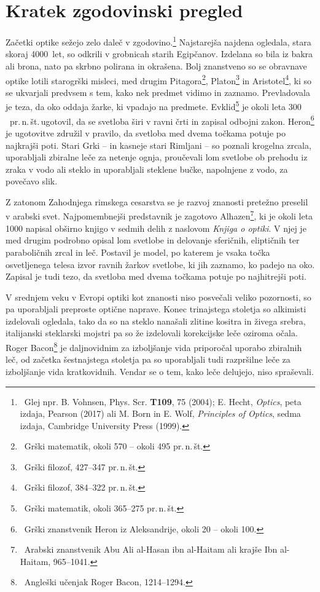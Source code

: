 \section{Kratek zgodovinski pregled}
Začetki optike sežejo zelo daleč v zgodovino.\footnote{~Glej 
npr. B. Vohnsen, Phys. Scr. {\bf T109}, 75 (2004); 
E. Hecht, {\it Optics}, peta izdaja, Pearson (2017) ali
M. Born in E. Wolf, {\it Principles of Optics}, sedma izdaja, 
Cambridge University Press (1999).} Najstarejša najdena ogledala, 
stara skoraj 4000~let, so odkrili v grobnicah starih Egipčanov. 
Izdelana so bila iz bakra ali brona, nato pa skrbno polirana in okrašena. 
Bolj znanstveno so se obravnave optike lotili starogrški
misleci, med drugim Pitagora\footnote{~Grški 
matematik, okoli 570 -- okoli 495 pr.\,n.\,št.}, Platon\footnote{~Grški 
filozof, 427--347 pr.\,n.\,št.} in Aristotel\footnote{~Grški 
filozof, 384--322 pr.\,n.\,št.}, ki so se 
ukvarjali predvsem s tem, kako nek predmet vidimo in zaznamo. Prevladovala
je teza, da oko oddaja žarke, ki vpadajo na predmete.
Evklid\footnote{~Grški 
matematik, okoli 365--275 pr.\,n.\,št.} je okoli leta $300$~pr.\,n.\,št.\,ugotovil, 
da se svetloba širi v ravni črti in zapisal odbojni zakon. Heron\footnote{~Grški 
znanstvenik Heron iz Aleksandrije, okoli 20 -- okoli 100.} je ugotovitve združil
v pravilo, da svetloba med dvema točkama potuje po najkrajši poti.
Stari Grki -- in kasneje stari Rimljani -- so poznali krogelna zrcala, 
uporabljali zbiralne leče za netenje ognja, 
proučevali lom svetlobe ob prehodu iz zraka v vodo ali steklo
in uporabljali steklene bučke, napolnjene z vodo, za povečavo slik.

Z zatonom Zahodnjega rimskega cesarstva se je razvoj znanosti pretežno 
preselil v arabski svet. Najpomembnejši predstavnik je zagotovo 
Alhazen\footnote{~Arabski znanstvenik Abu 
Ali al-Hasan ibn al-Haitam ali krajše Ibn al-Haitam, 965--1041.}, 
ki je okoli leta 1000 napisal obširno knjigo v sedmih delih
z naslovom {\it Knjiga o optiki}. 
V njej je med drugim podrobno opisal lom svetlobe in delovanje sferičnih,
eliptičnih ter paraboličnih zrcal in leč. Postavil je model, 
po katerem je vsaka točka osvetljenega telesa izvor
ravnih žarkov svetlobe, ki jih zaznamo, ko padejo na oko. 
Zapisal je tudi tezo, da svetloba med dvema točkama potuje po najhitrejši poti.

V srednjem veku v Evropi optiki kot znanosti niso posvečali veliko
pozornosti, so pa uporabljali preproste optične naprave. 
Konec trinajstega stoletja so alkimisti izdelovali ogledala, 
tako da so na steklo nanašali zlitine kositra in živega srebra, 
italijanski steklarski mojstri pa so že izdelovali korekcijske leče 
oziroma očala. Roger Bacon\footnote{~Angleški učenjak Roger Bacon, 1214--1294.}
je daljnovidnim za izboljšanje vida priporočal uporabo zbiralnih leč, 
od začetka šestnajstega stoletja pa so uporabljali tudi razpršilne leče
za izboljšanje vida kratkovidnih. Vendar se o tem, kako leče delujejo, 
niso spraševali. 

